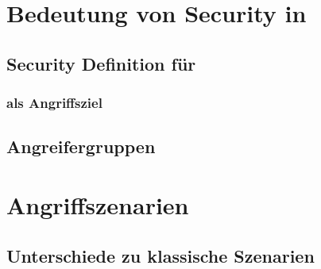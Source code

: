 \documentclass[final,bibliography=totocnumbered]{include/sikseminar}
\begin{document}
\section{Bedeutung von Security in }\label{sec:bedeutung-security}


\subsection{Security Definition f\"ur }\label{subsec:definition}


\subsubsection{ als Angriffsziel}\label{subsec:angriffsziel}

\subsection{Angreifergruppen}\label{subsec:angreifergruppen}


\section{Angriffszenarien}\label{sec:angriffszenarien}
\subsection{Unterschiede zu klassische Szenarien}\label{subsec:klassisch}
\end{document}
